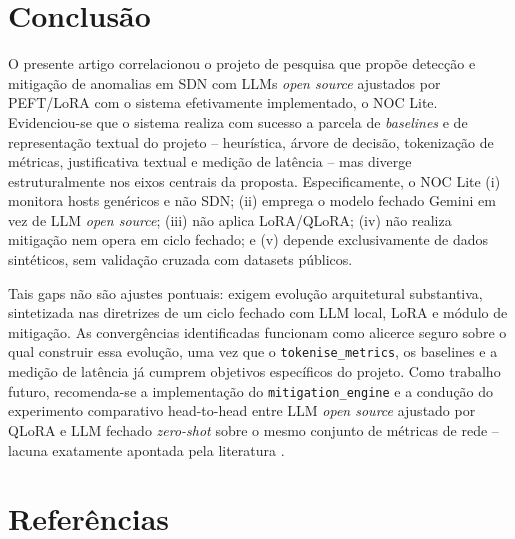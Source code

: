 \documentclass[12pt,a4paper]{article}
\begin{document}
\section{Conclusão}
\label{sec:conclusao}

O presente artigo correlacionou o projeto de pesquisa que propõe detecção e
mitigação de anomalias em SDN com LLMs \textit{open source} ajustados por
PEFT/LoRA \cite{rRODRIGUES} com o sistema efetivamente implementado, o NOC Lite.
Evidenciou-se que o sistema realiza com sucesso a parcela de \textit{
baselines} e de representação textual do projeto -- heurística, árvore de
decisão, tokenização de métricas, justificativa textual e medição de latência
-- mas diverge estruturalmente nos eixos centrais da proposta. Especificamente,
o NOC Lite (i) monitora hosts genéricos e não SDN; (ii) emprega o modelo
fechado Gemini em vez de LLM \textit{open source}; (iii) não aplica LoRA/QLoRA;
(iv) não realiza mitigação nem opera em ciclo fechado; e (v) depende
exclusivamente de dados sintéticos, sem validação cruzada com datasets
públicos.

Tais gaps não são ajustes pontuais: exigem evolução arquitetural substantiva,
sintetizada nas diretrizes de um ciclo fechado com LLM local, LoRA e módulo de
mitigação. As convergências identificadas funcionam como alicerce seguro sobre
o qual construir essa evolução, uma vez que o \texttt{tokenise\_metrics}, os
baselines e a medição de latência já cumprem objetivos específicos do projeto.
Como trabalho futuro, recomenda-se a implementação do \texttt{mitigation\_engine}
e a condução do experimento comparativo head-to-head entre LLM \textit{open
source} ajustado por QLoRA e LLM fechado \textit{zero-shot} sobre o mesmo
conjunto de métricas de rede -- lacuna exatamente apontada pela literatura
\cite{rA49}\cite{rA630}.

\section*{Referências}

\end{document}
